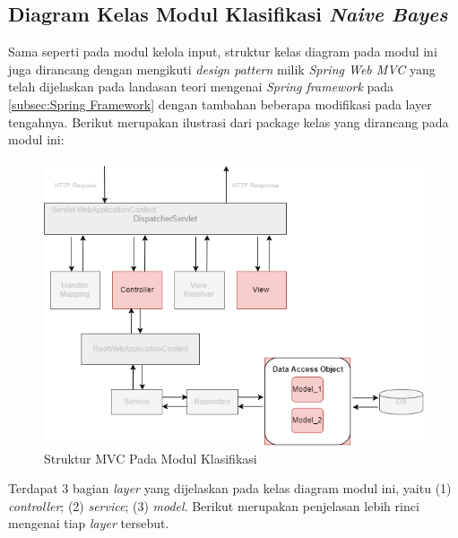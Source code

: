 
\subsection{Diagram Kelas Modul Klasifikasi \textit{Naive Bayes}}

Sama seperti pada modul kelola input, struktur kelas diagram pada modul ini juga dirancang dengan mengikuti \textit{design pattern} milik \textit{Spring Web MVC} yang telah dijelaskan pada landasan teori mengenai \textit{Spring framework} pada \ref{subsec:Spring Framework} dengan tambahan beberapa modifikasi pada layer tengahnya. Berikut merupakan ilustrasi dari package kelas yang dirancang pada modul ini:
\begin{figure}[H]
	\centering
	\includegraphics[scale=0.7]{ClassDiagramLengkap/springmvc_rev1}
	\caption[Struktur MVC Pada Modul Klasifikasi]{Struktur MVC Pada Modul Klasifikasi}
	\label{fig:Struktur MVC Pada Modul Klasifikasi}
\end{figure}

Terdapat 3 bagian \textit{layer} yang dijelaskan pada kelas diagram modul ini, yaitu (1) \textit{controller}; (2) \textit{service}; (3) \textit{model}. Berikut merupakan penjelasan lebih rinci mengenai tiap \textit{layer} tersebut.

